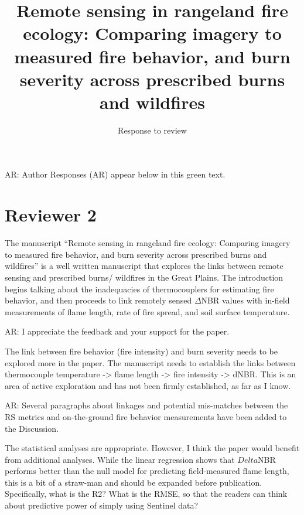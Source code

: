 \documentclass[parskip=half, american]{scrartcl}
\title{\Large Remote sensing in rangeland fire ecology: Comparing imagery to measured fire behavior, and burn severity across prescribed burns and wildfires  }
\subtitle{Response to review}
\author{ }
\date{}
\newcommand{\AR}[1]
	{\color{PineGreen}AR: #1\color{black} \par }
\begin{document}
\maketitle

\vspace{-2cm} 

\AR{Author Responses (AR) appear below in this green text.}

\section*{Reviewer 2}

The manuscript ``Remote sensing in rangeland fire ecology: Comparing imagery to measured fire behavior, and burn severity across prescribed burns and wildfires'' is a well written manuscript that explores the links between remote sensing and prescribed burns/ wildfires in the Great Plains. The introduction begins talking about the inadequacies of thermocouplers for estimating fire behavior, and then proceeds to link remotely sensed $\Delta$NBR values with in-field measurements of flame length, rate of fire spread, and soil surface temperature.

\AR{I appreciate the feedback and your support for the paper.}

The link between fire behavior (fire intensity) and burn severity needs to be explored more in the paper. 
The manuscript needs to establish the links between thermocouple temperature -> flame length -> fire intensity -> dNBR. 
This is an area of active exploration and has not been firmly established, as far as I know.

\AR{Several paragraphs about linkages and potential mis-matches between the RS metrics and on-the-ground fire behavior measurements have been added to the Discussion.  }

The statistical analyses are appropriate. However, I think the paper would benefit from additional analyses. While the linear regression shows that $Delta$NBR performs better than the null model for predicting field-measured flame length, this is a bit of a straw-man and should be expanded before publication. Specifically, what is the R2? What is the RMSE, so that the readers can think about predictive power of simply using Sentinel data?
\end{document}
